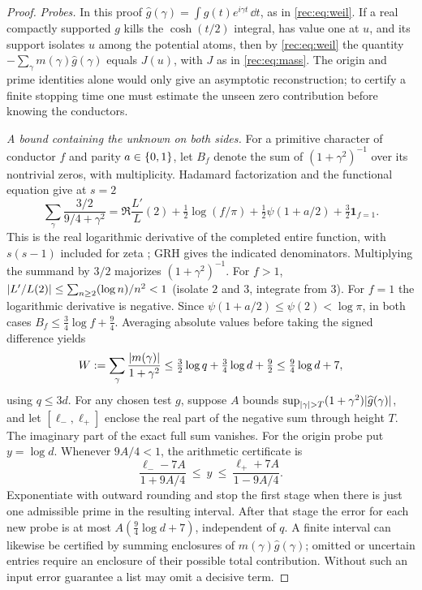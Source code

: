 \begin{proof}
\emph{Probes.} In this proof $\widehat g(\gamma)=\int g(t)e^{i\gamma t}\,\dd t$, as in
\eqref{rec:eq:weil}. If a real compactly supported $g$ kills the $\cosh(t/2)$ integral, has
value one at $u$, and its support isolates $u$ among the potential atoms, then by
\eqref{rec:eq:weil} the quantity $-\sum_\gamma m(\gamma)\widehat g(\gamma)$ equals $J(u)$,
with $J$ as in \eqref{rec:eq:mass}. The origin and prime identities alone would only give
an asymptotic reconstruction; to certify a finite stopping time one must estimate the unseen
zero contribution before knowing the conductors.

\emph{A bound containing the unknown on both sides.} For a primitive character of conductor
$f$ and parity $a\in\{0,1\}$, let $B_f$ denote the sum of $(1+\gamma^2)^{-1}$ over its
nontrivial zeros, with multiplicity. Hadamard factorization and the functional equation give
at $s=2$
\[
 \sum_\gamma\frac{3/2}{9/4+\gamma^2}=\Re\frac{L'}L(2)+\tfrac12\log(f/\pi)
 +\tfrac12\psi(1+a/2)+\tfrac32\mathbf 1_{f=1}.
\]
This is the real logarithmic derivative of the completed entire function, with $s(s-1)$
included for zeta \cite{LamzouriLiSoundararajan2015Conditional}; GRH gives the indicated
denominators. Multiplying the summand by $3/2$ majorizes $(1+\gamma^2)^{-1}$. For $f>1$,
$\lvert L'/L(2)\rvert\le\sum_{n\ge2}(\log n)/n^2<1$ (isolate $2$ and $3$, integrate from $3$). For
$f=1$ the logarithmic derivative is negative. Since $\psi(1+a/2)\le\psi(2)<\log\pi$, in
both cases $B_f\le\tfrac34\log f+\tfrac94$. Averaging absolute values before taking the
signed difference yields
\[
 W:=\sum_\gamma\frac{\lvert m(\gamma)\rvert}{1+\gamma^2}
 \le\tfrac32\log q+\tfrac34\log d+\tfrac92\le\tfrac94\log d+7,
\]
using $q\le3d$. For any chosen test $g$, suppose $A$ bounds
$\sup_{\lvert\gamma\rvert>T}(1+\gamma^2)\lvert\widehat g(\gamma)\rvert$, and let $[\ell_-,\ell_+]$ enclose the real
part of the negative sum through height $T$. The imaginary part of the exact full sum
vanishes. For the origin probe put $y=\log d$. Whenever $9A/4<1$, the arithmetic certificate
is
\begin{equation}\label{rec:eq:certificate}
 \frac{\ell_--7A}{1+9A/4}\ \le\ y\ \le\ \frac{\ell_++7A}{1-9A/4}.
\end{equation}
Exponentiate with outward rounding and stop the first stage when there is just one
admissible prime in the resulting interval. After that stage the error for each new probe
is at most $A(\tfrac94\log d+7)$, independent of $q$. A finite interval can likewise be
certified by summing enclosures of $m(\gamma)\widehat g(\gamma)$; omitted or uncertain
entries require an enclosure of their possible total contribution. Without such an input
error guarantee a list may omit a decisive term.


\end{proof}

